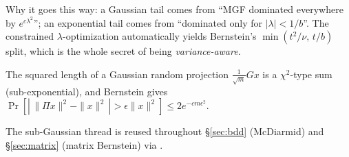 \begin{strand}
Why it goes this way: a Gaussian tail comes from ``MGF dominated everywhere by $e^{c\lambda^2}$'';
an exponential tail comes from ``dominated only for $|\lambda|<1/b$''. The constrained $\lambda$-optimization
automatically yields Bernstein's $\min(t^2/\nu,\,t/b)$ split, which is the whole secret of being \emph{variance-aware}.
\end{strand}

\begin{example}\label{ex:jl}
The squared length of a Gaussian random projection $\frac1{\sqrt m}Gx$ is a $\chi^2$-type sum (sub-exponential),
and Bernstein gives $\Pr[|\,\|\Pi x\|^2-\|x\|^2\,|>\epsilon\|x\|^2]\le 2e^{-cm\epsilon^2}$.
\end{example}

%
\quad
{} The sub-Gaussian thread is reused throughout §\ref{sec:bdd} (McDiarmid) and §\ref{sec:matrix} (matrix Bernstein) via .
